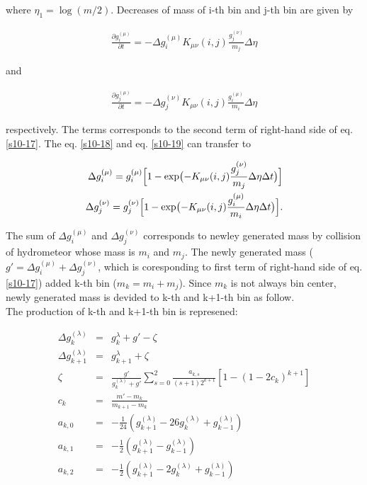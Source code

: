  where $\eta_{1}=\log(m/2)$. Decreases of mass of i-th bin and j-th bin are given by

\begin{eqnarray}
\frac{\partial g_{i}^{(\mu)}}{\partial t}=-\Delta g^{(\mu)}_{i} K_{\mu\nu}(i,j)\frac{g_{j}^{(\nu)}}{m_{j}}\Delta \eta\label{s10-18}
\end{eqnarray}

and


\begin{eqnarray}
\frac{\partial g_{j}^{(\mu)}}{\partial t}=-\Delta g^{(\nu)}_{j}K_{\mu\nu}(i,j)\frac{g_{i}^{(\mu)}}{m_{i}}\Delta \eta\label{s10-19}
\end{eqnarray}

respectively. The terms corresponds to the second term of right-hand side of eq.\ref{s10-17}. The eq. \ref{s10-18} and eq. \ref{s10-19} can transfer to

\begin{eqnarray}
\Delta g_{i}^{(\mu)}=g_{i}^{(\mu)}\Bigl [1-\exp\bigl(-K_{\mu\nu}(i,j)\frac{g^{(\nu)}_{j}}{m_{j}}\Delta \eta\Delta t\bigr) \Bigl]\label{s10-20}\\
\Delta g_{j}^{(\nu)}=g_{j}^{(\nu)}\Bigl [1-\exp\bigl(-K_{\mu\nu}(i,j)\frac{g^{(\mu)}_{i}}{m_{i}}\Delta \eta\Delta t\bigr) \Bigl].\label{s10-21}
\end{eqnarray}

The sum of $\Delta g_{i}^{(\mu)}$ and $\Delta g_{j}^{(\nu)}$ corresponds to newley generated mass by collision of hydrometeor whose mass is $m_{i}$ and $m_{j}$. The newly generated mass ($g'=\Delta g_{i}^{(\mu)}+\Delta g_{j}^{(\nu)}$, which is coresponding to first term of right-hand side of eq.\ref{s10-17}) added k-th bin ($m_{k}=m_{i}+m_{j}$). Since $m_{k}$ is not always bin center, newly generated mass is devided to k-th and k+1-th bin as follow.\\
The production of k-th and k+1-th bin is represened:

\begin{eqnarray}
\Delta g_{k}^{(\lambda)}&=&g_{k}^{\lambda}+g'-\zeta\label{s10-22}\\
\Delta g_{k+1}^{(\lambda)}&=&g_{k+1}^{\lambda}+\zeta\label{s10-23}\\
\zeta&=&\frac{g'}{g_{k}^{(\lambda)}+g'}\sum_{s=0}^{2}\frac{a_{k,s}}{(s+1)2^{k+1}}[1-(1-2c_{k})^{k+1}]\nonumber\\
c_{k}&=&\frac{m'-m_{k}}{m_{k+1}-m_{k}}\nonumber\\
a_{k,0}&=&-\frac{1}{24}(g_{k+1}^{(\lambda)}-26g_{k}^{(\lambda)}+g_{k-1}^{(\lambda)})\nonumber\\
a_{k,1}&=&-\frac{1}{2}(g_{k+1}^{(\lambda)}-g_{k-1}^{(\lambda)})\nonumber\\
a_{k,2}&=&-\frac{1}{2}(g_{k+1}^{(\lambda)}-2g_{k}^{(\lambda)}+g_{k-1}^{(\lambda)})\nonumber
\end{eqnarray}

